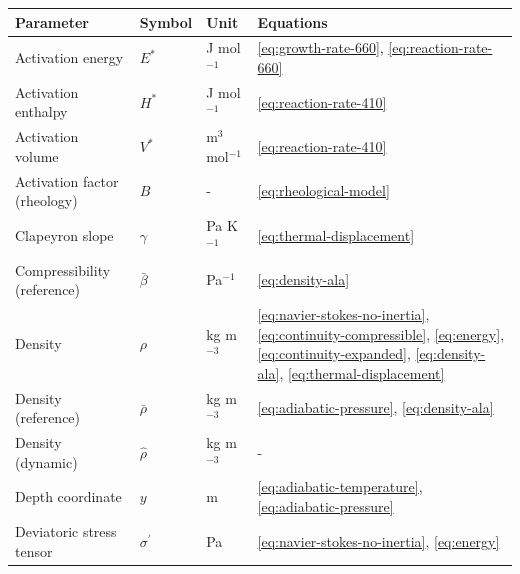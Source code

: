 \documentclass[draft,linenumbers]{agujournal2019}
\newcounter{none}
\begin{document}
{\def\LTcaptype{none} %
\begin{longtable}[]{@{}
  >{\raggedright\arraybackslash}p{}
  >{\raggedright\arraybackslash}p{}
  >{\raggedright\arraybackslash}p{}
  >{\raggedright\arraybackslash}p{}@{}}
\toprule\noalign{}
\begin{minipage}[b]{\linewidth}\raggedright
Parameter
\end{minipage} & \begin{minipage}[b]{\linewidth}\raggedright
Symbol
\end{minipage} & \begin{minipage}[b]{\linewidth}\raggedright
Unit
\end{minipage} & \begin{minipage}[b]{\linewidth}\raggedright
Equations
\end{minipage} \\
\midrule\noalign{}
\endhead
\bottomrule\noalign{}
\endlastfoot
Activation energy & \(E^{\ast}\) & J mol\(^{-1}\) &
\ref{eq:growth-rate-660}, \ref{eq:reaction-rate-660} \\
Activation enthalpy & \(H^{\ast}\) & J mol\(^{-1}\) &
\ref{eq:reaction-rate-410} \\
Activation volume & \(V^{\ast}\) & m\(^3\) mol\(^{-1}\) &
\ref{eq:reaction-rate-410} \\
Activation factor (rheology) & \(B\) & - & \ref{eq:rheological-model} \\
Clapeyron slope & \(\gamma\) & Pa K\(^{-1}\) &
\ref{eq:thermal-displacement} \\
Compressibility (reference) & \(\bar{\beta}\) & Pa\(^{-1}\) &
\ref{eq:density-ala} \\
Density & \(\rho\) & kg m\(^{-3}\) &
\ref{eq:navier-stokes-no-inertia}, \ref{eq:continuity-compressible}, \ref{eq:energy}, \ref{eq:continuity-expanded}, \ref{eq:density-ala}, \ref{eq:thermal-displacement} \\
Density (reference) & \(\bar{\rho}\) & kg m\(^{-3}\) &
\ref{eq:adiabatic-pressure}, \ref{eq:density-ala} \\
Density (dynamic) & \(\hat{\rho}\) & kg m\(^{-3}\) & - \\
Depth coordinate & \(y\) & m &
\ref{eq:adiabatic-temperature}, \ref{eq:adiabatic-pressure} \\
Deviatoric stress tensor & \(\sigma^{\prime}\) & Pa &
\ref{eq:navier-stokes-no-inertia}, \ref{eq:energy} \\

\end{longtable}}
\end{document}
